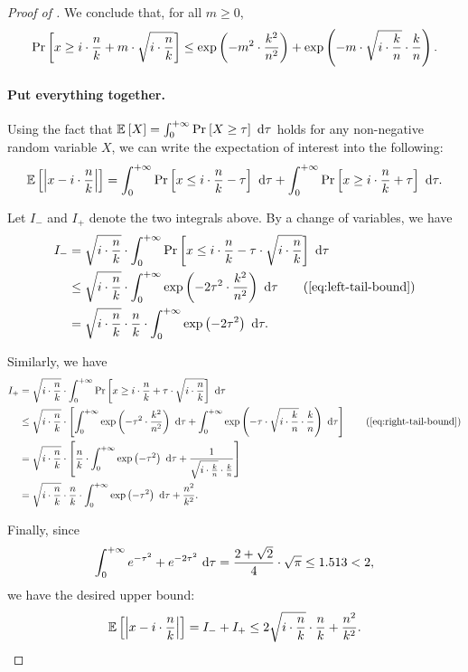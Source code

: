\begin{proof}[Proof of ]
We conclude that, for all $m \ge 0$,
\begin{equation}\label{eq:right-tail-bound}
    \Pr_{}\left[x \ge i\cdot \frac{n}{k} + m\cdot \sqrt{i\cdot \frac{n}{k}}\right]
\le \exp\left(-m^2\cdot \frac{k^2}{n^2}\right) + \exp\left(-m\cdot \sqrt{i\cdot \frac{k}{n}}\cdot \frac{k}{n}\right).
\end{equation}

    \paragraph{Put everything together.} Using the fact that $\operatorname*{\mathbb{E}}_{}\left[X\right] = \int_{0}^{+\infty}\Pr_{}\left[X \ge \tau\right]~\mathrm{d}\tau$ holds for any non-negative random variable $X$, we can write the expectation of interest into the following:
    \[
        \operatorname*{\mathbb{E}}_{}\left[\left|x - i\cdot\frac{n}{k}\right|\right]
    =   \int_{0}^{+\infty}\Pr_{}\left[x \le i\cdot\frac{n}{k} - \tau\right]~\mathrm{d}\tau + \int_{0}^{+\infty}\Pr_{}\left[x \ge i\cdot\frac{n}{k} + \tau\right]~\mathrm{d}\tau.
    \]

    Let $I_{-}$ and $I_{+}$ denote the two integrals above. By a change of variables, we have
    \begin{align*}
        I_{-}
    &=  \sqrt{i \cdot\frac{n}{k}}\cdot\int_{0}^{+\infty}\pr{}{x \le i\cdot\frac{n}{k} - \tau\cdot \sqrt{i \cdot\frac{n}{k}}}~\rmd\tau\\
    &\le\sqrt{i \cdot\frac{n}{k}}\cdot\int_{0}^{+\infty}\exp\left(-2\tau^2\cdot\frac{k^2}{n^2}\right)~\rmd\tau \tag{\Cref{eq:left-tail-bound}}\\
    &=  \sqrt{i \cdot\frac{n}{k}}\cdot\frac{n}{k}\cdot\int_{0}^{+\infty}\exp\left(-2\tau^2\right)~\rmd\tau.
    \end{align*}

    Similarly, we have
    \begin{align*}
        I_{+}
    &=  \sqrt{i \cdot\frac{n}{k}}\cdot\int_{0}^{+\infty}\pr{}{x \ge i\cdot\frac{n}{k} + \tau\cdot \sqrt{i \cdot\frac{n}{k}}}~\rmd\tau\\
    &\le\sqrt{i \cdot\frac{n}{k}}\cdot\left[\int_{0}^{+\infty}\exp\left(-\tau^2\cdot\frac{k^2}{n^2}\right)~\rmd\tau + \int_{0}^{+\infty}\exp\left(-\tau\cdot\sqrt{i \cdot \frac{k}{n}}\cdot\frac{k}{n}\right)~\rmd\tau\right] \tag{\Cref{eq:right-tail-bound}}\\
    &=  \sqrt{i \cdot\frac{n}{k}}\cdot\left[\frac{n}{k}\cdot\int_{0}^{+\infty}\exp\left(-\tau^2\right)~\rmd\tau + \frac{1}{\sqrt{i \cdot \frac{k}{n}}\cdot\frac{k}{n}}\right]\\
    &=  \sqrt{i\cdot\frac{n}{k}}\cdot\frac{n}{k}\cdot \int_{0}^{+\infty}\exp\left(-\tau^2\right)~\rmd\tau + \frac{n^2}{k^2}.
    \end{align*}

    Finally, since
    \[
        \int_{0}^{+\infty}e^{-\tau^2} + e^{-2\tau^2}~\mathrm{d}\tau
    =   \frac{2 + \sqrt{2}}{4}\cdot\sqrt{\pi}
    \le 1.513
    <   2,
    \]
    we have the desired upper bound:
    \[
        \operatorname*{\mathbb{E}}_{}\left[\left|x - i\cdot\frac{n}{k}\right|\right]
    =   I_{-} + I_{+}
    \le 2\sqrt{i\cdot\frac{n}{k}}\cdot\frac{n}{k} + \frac{n^2}{k^2}.
    \]
\end{proof}

